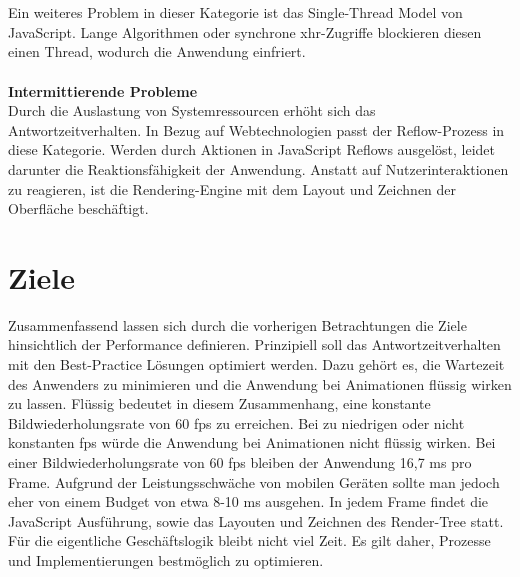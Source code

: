 \\\\
Ein weiteres Problem in dieser Kategorie ist das Single-Thread Model von JavaScript. Lange Algorithmen oder synchrone \gls{xhr}-Zugriffe blockieren diesen einen Thread, wodurch die Anwendung einfriert.
\\\\
\textbf{Intermittierende Probleme}
\\
Durch die Auslastung von Systemressourcen erhöht sich das Antwortzeitverhalten. In Bezug auf Webtechnologien passt der \gls{Reflow}-Prozess in diese Kategorie. Werden durch Aktionen in JavaScript \glspl{Reflow} ausgelöst, leidet darunter die Reaktionsfähigkeit der Anwendung. Anstatt auf Nutzerinteraktionen zu reagieren, ist die Rendering-Engine mit dem Layout und Zeichnen der Oberfläche beschäftigt.

\section{Ziele}
\label{performance-ziele}

Zusammenfassend lassen sich durch die vorherigen Betrachtungen die Ziele hinsichtlich der Performance definieren. Prinzipiell soll das Antwortzeitverhalten mit den Best-Practice Lösungen optimiert werden. Dazu gehört es, die Wartezeit des Anwenders zu minimieren und die Anwendung bei Animationen flüssig wirken zu lassen. Flüssig bedeutet in diesem Zusammenhang, eine konstante Bildwiederholungsrate von 60 \gls{fps} zu erreichen. Bei zu niedrigen oder nicht konstanten \gls{fps} würde die Anwendung bei Animationen nicht flüssig wirken. Bei einer Bildwiederholungsrate von 60 \gls{fps} bleiben der Anwendung 16,7 ms pro Frame. Aufgrund der Leistungsschwäche von mobilen Geräten sollte man jedoch eher von einem Budget von etwa 8-10 ms ausgehen. In jedem Frame findet die JavaScript Ausführung, sowie das Layouten und Zeichnen des Render-Tree statt. Für die eigentliche Geschäftslogik bleibt nicht viel Zeit. Es gilt daher, Prozesse und Implementierungen bestmöglich zu optimieren.\cite{PinterestPaintPerformance}

